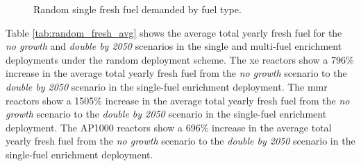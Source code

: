 \begin{figure}[H]
    \hfill
    \caption{Random single fresh fuel demanded by fuel type.}
    \label{fig:random_of_fresh}
\end{figure}

Table \ref{tab:random_fresh_avg} shows the average total yearly fresh fuel for the \textit{no growth} and \textit{double by 2050} scenarios in the single and multi-fuel enrichment deployments under the random deployment scheme. The \gls{xe} reactors show a 796\% increase in the average total yearly fresh fuel from the \textit{no growth} scenario to the \textit{double by 2050} scenario in the single-fuel enrichment deployment. The \gls{mmr} reactors show a 1505\% increase in the average total yearly fresh fuel from the \textit{no growth} scenario to the \textit{double by 2050} scenario in the single-fuel enrichment deployment. The AP1000 reactors show a 696\% increase in the average total yearly fresh fuel from the \textit{no growth} scenario to the \textit{double by 2050} scenario in the single-fuel enrichment deployment.

